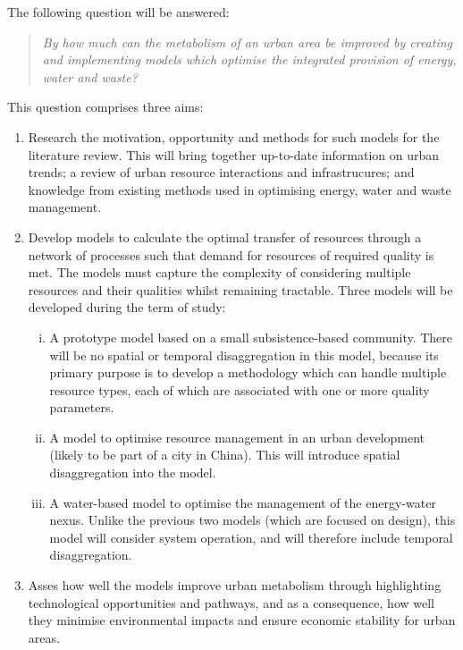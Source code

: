 The following question will be answered:
\begin{quote}
	\emph{By how much can the metabolism of an urban area be improved by creating and implementing models which optimise the integrated provision of energy, water and waste?}
\end{quote}
This question comprises three aims:
\begin{enumerate}
	\item Research the motivation, opportunity and methods for such models for the literature review. This will bring together up-to-date information on urban trends; a review of urban resource interactions and infrastrucures; and knowledge from existing methods used in optimising energy, water and waste management.
	\item Develop models to calculate the optimal transfer of resources through a network of processes such that demand for resources of required quality is met. The models must capture the complexity of considering multiple resources and their qualities whilst remaining tractable. Three models will be developed during the term of study:
		\begin{enumerate}[(i)]
			\item A prototype model based on a small subsistence-based community. There will be no spatial or temporal disaggregation in this model, because its primary purpose is to develop a methodology which can handle multiple resource types, each of which are associated with one or more quality parameters.
			\item A model to optimise resource management in an urban development (likely to be part of a city in China). This will introduce spatial disaggregation into the model.
			\item A water-based model to optimise the management of the energy-water nexus. Unlike the previous two models (which are focused on design), this model will consider system operation, and will therefore include temporal disaggregation.
		\end{enumerate}
	\item Asses how well the models improve urban metabolism through highlighting technological opportunities and pathways, and as a consequence, how well they minimise environmental impacts and ensure economic stability for urban areas.
\end{enumerate}

